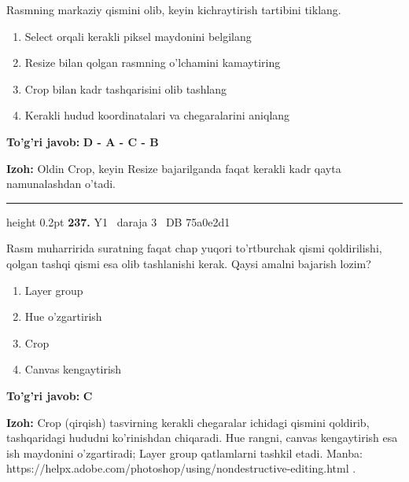 \documentclass[10pt,a4paper,oneside]{article}
\begin{document}
\par
Rasmning markaziy qismini olib, keyin kichraytirish tartibini tiklang.
\begin{enumerate}[label=\Alph*),leftmargin=9mm]
\item Select orqali kerakli piksel maydonini belgilang
\item Resize bilan qolgan rasmning o'lchamini kamaytiring
\item Crop bilan kadr tashqarisini olib tashlang
\item Kerakli hudud koordinatalari va chegaralarini aniqlang
\end{enumerate}
\begin{tcolorbox}[enhanced,breakable,colback=teal!4,colframe=teal!45!black,boxrule=0.45pt,arc=1.2mm,left=2.8mm,right=2.8mm,top=2mm,bottom=2mm,before skip=2mm,after skip=2mm]
\textbf{\color{teal}To'g'ri javob:} \textbf{D - A - C - B}
\par\smallskip
\textbf{Izoh:} Oldin Crop, keyin Resize bajarilganda faqat kerakli kadr qayta namunalashdan o'tadi.
\end{tcolorbox}
\vspace{2mm}\hrule height 0.2pt \vspace{4mm}
\hypertarget{q237}{\textbf{\color{ink}237.}}  {\color{muted}\scriptsize Y1 \textbullet\ daraja 3 \textbullet\ DB 75a0e2d1}
\par
Rasm muharririda suratning faqat chap yuqori to'rtburchak qismi qoldirilishi, qolgan tashqi qismi esa olib tashlanishi kerak. Qaysi amalni bajarish lozim?
\begin{enumerate}[label=\Alph*),leftmargin=9mm]
\item Layer group
\item Hue o'zgartirish
\item Crop
\item Canvas kengaytirish
\end{enumerate}
\begin{tcolorbox}[enhanced,breakable,colback=teal!4,colframe=teal!45!black,boxrule=0.45pt,arc=1.2mm,left=2.8mm,right=2.8mm,top=2mm,bottom=2mm,before skip=2mm,after skip=2mm]
\textbf{\color{teal}To'g'ri javob:} \textbf{C}
\par\smallskip
\textbf{Izoh:} Crop (qirqish) tasvirning kerakli chegaralar ichidagi qismini qoldirib, tashqaridagi hududni ko'rinishdan chiqaradi. Hue rangni, canvas kengaytirish esa ish maydonini o'zgartiradi; Layer group qatlamlarni tashkil etadi. Manba: https://helpx.adobe.com/photoshop/using/nondestructive-editing.html .
\end{tcolorbox}
\end{document}
